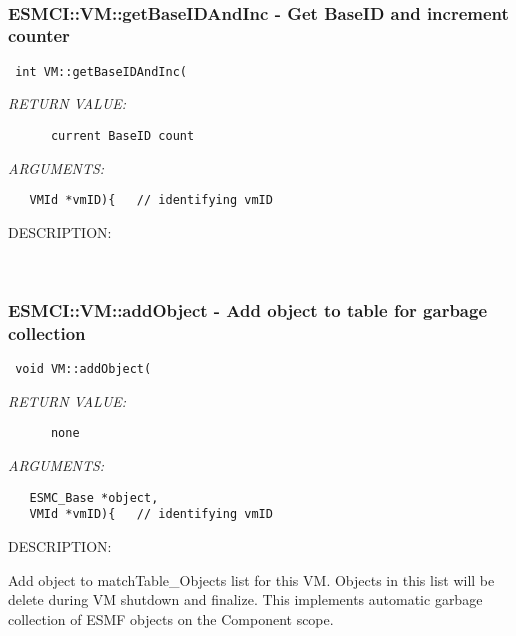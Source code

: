 {%
 
\mbox{}\hrulefill\
 
\subsubsection [ESMCI::VM::getBaseIDAndInc] {ESMCI::VM::getBaseIDAndInc - Get BaseID and increment counter}


  
\begin{verbatim} int VM::getBaseIDAndInc(\end{verbatim}{\em RETURN VALUE:}
\begin{verbatim}      current BaseID count\end{verbatim}{\em ARGUMENTS:}
\begin{verbatim}   VMId *vmID){   // identifying vmID\end{verbatim}
{\sf DESCRIPTION:\\ }


   
 
\mbox{}\hrulefill\
 
\subsubsection [ESMCI::VM::addObject] {ESMCI::VM::addObject - Add object to table for garbage collection}


  
\begin{verbatim} void VM::addObject(\end{verbatim}{\em RETURN VALUE:}
\begin{verbatim}      none\end{verbatim}{\em ARGUMENTS:}
\begin{verbatim}   ESMC_Base *object,
   VMId *vmID){   // identifying vmID\end{verbatim}
{\sf DESCRIPTION:\\ }


      Add object to matchTable_Objects list for this VM. Objects in this
      list will be delete during VM shutdown and finalize. This implements
      automatic garbage collection of ESMF objects on the Component scope.
   
 
}
